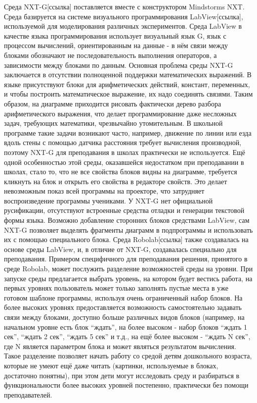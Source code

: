 Среда NXT-G[ссылка] поставляется вместе с конструктором Mindstorms NXT. Среда базируется на системе визуального программирования LabView[ссылка], используемой для моделирования различных экспериментов. Среда LabView в качестве языка программирования использует визуальный язык G, язык с процессом вычислений, ориентированным на данные - в нём связи между блоками обозначают не последовательность выполнения операторов, а зависимости между блоками по данным. Основная проблема среды NXT-G заключается в отсутствии полноценной поддержки математических выражений. В языке присутствуют блоки для арифметических действий, констант, переменных, и чтобы построить математическое выражение, их надо соединять связями. Таким образом, на диаграмме приходится рисовать фактически дерево разбора арифметического выражения, что делает программирование даже несложных задач, требующих математики, чрезвычайно утомительным. В школьной программе такие задачи возникают часто, например, движение по линии или езда вдоль стены с помощью датчика расстояния требует вычисления производной, поэтому NXT-G для преподавания в школах практически не используется. Ещё одной особенностью этой среды, оказавшейся недостатком при преподавании в школах, стало то, что не все свойства блоков видны на диаграмме, требуется кликнуть на блок и открыть его свойства в редакторе свойств. Это делает невозможным показ всей программы на проекторе, что затрудняет воспроизведение программы учениками. У NXT-G нет официальной русификации, отсутствуют встроенные средства отладки и генерации текстовой формы языка. Возможно добавление сторонних блоков средствами LabView, сам NXT-G позволяет выделять фрагменты диаграмм в подпрограммы и использовать их с помощью специального блока.
Среда Robolab[ссылка] также создавалась на основе среды LabView, и, в отличие от NXT-G, создавалась специально для преподавания. Примером специфичного для преподавания решения, принятого в среде Robolab, может послужить разделение возможностей среды на уровни. При запуске среды предлагается выбрать уровень, на котором будет вестись работа, на первых уровнях пользователь может только заполнять пустые места в уже готовом шаблоне программы, используя очень ограниченный набор блоков. На более высоких уровнях предоставляется возможность самостоятельно задавать связи между блоками, доступно больше различных видов блоков (например, на начальном уровне есть блок “ждать”, на более высоком - набор блоков “ждать 1 сек”, “ждать 2 сек”, “ждать 5 сек” и т.д., на ещё более высоком - “ждать N сек”, где N является параметром блока и может являться результатом вычисления. Такое разделение позволяет начать работу со средой детям дошкольного возраста, которые не умеют ещё даже читать (картинки, используемые в блоках, достаточно понятны), при этом дети могут исследовать среду и разбираться в функциональности более высоких уровней постепенно, практически без помощи преподавателей.
